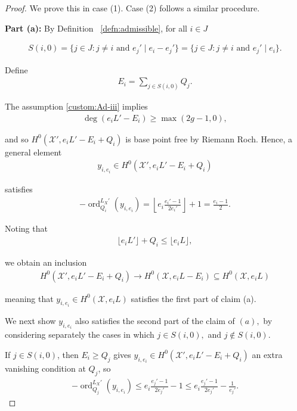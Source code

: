\documentclass{amsart}
\theoremstyle{plain}
\theoremstyle{definition}
\theoremstyle{remark}
\numberwithin{equation}{section}
\DeclareMathOperator{\ord}{ord}
\newcommand\sx{\mathscr X}
\newcommand \subhalf[1]{\frac{{#1} - 1}{2{#1}}}
\newcommand{\halfcan}{L}
\begin{document}
\begin{proof}
We prove this in case (1). Case (2) follows a similar procedure.

{\bf Part (a):} 
By Definition ~\ref{defn:admissible}, for all $i\in J$

\begin{align*}
	S(i,0) = \{j \in J : j \neq i \text{ and }e_j' \mid e_i-e_j'\} = \{j \in J : j \neq i \text{ and }e_j' \mid e_i\}.
\end{align*}

\noindent
Define
\begin{align*}
	E_i = \sum_{j \in S(i,0)}^{}Q_j.
\end{align*}

\noindent
The assumption \ref{custom:Ad-iii} implies
\begin{align*}
	\deg \left( e_i L' - E_i \right) \geq \max(2g - 1,0),
\end{align*}

\noindent
and so $H^0(\sx', e_iL'-E_i + Q_i)$ is base point free by 
Riemann Roch.
Hence, a general element
\begin{align*}
	y_{i, e_i} \in H^0(\sx', e_iL'-E_i + Q_i)
\end{align*}

\noindent
satisfies
\begin{align*}
	-\ord_{Q_i}
^{\halfcan_X'}(y_{i, e_i}) = \left\lfloor e_i \subhalf {e_i'} \right\rfloor + 1 =
	\frac{e_i - 1}{2}.
\end{align*}


Noting that
\begin{align*}
	\lfloor e_i L' \rfloor + Q_i \leq \lfloor e_i L \rfloor,
\end{align*}

\noindent
we obtain an inclusion
\begin{align*}
	H^0(\sx', e_iL'-E_i + Q_i) \rightarrow H^0(\sx, e_iL - E_i) \subseteq 
H^0(\sx, e_iL)
\end{align*}

\noindent
meaning that $y_{i,e_i}\in H^0(\sx,e_iL)$ satisfies the first part of claim (a).


We next show $y_{i, e_i}$ also satisfies the second part of the
claim of $(a),$ by considering separately the cases in which $j
\in S(i, 0),$ and $j \notin S(i,0)$.

If $j \in S(i,0)$, then $E_i \geq Q_j$ gives $y_{i, e_i} \in H^0
(\sx', e_iL'-E_i + Q_i)$ an extra vanishing condition at $Q_j$, so
\begin{align*}
	-\ord_{Q_j}
^{\halfcan_X'}(y_{i, e_i}) \leq e_i\subhalf {e_j'} - 1 \leq e_i 
	\subhalf{e_j'} - \frac{1}{e_j'}.
\end{align*}


\end{proof}
\end{document}
